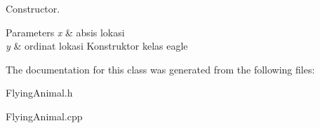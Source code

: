 Constructor. 


\begin{DoxyParams}{Parameters}
{\em x} & absis lokasi \\
\hline
{\em y} & ordinat lokasi Konstruktor kelas eagle \\
\hline
\end{DoxyParams}


The documentation for this class was generated from the following files\+:\begin{DoxyCompactItemize}
\item 
Flying\+Animal.\+h\item 
Flying\+Animal.\+cpp\end{DoxyCompactItemize}

